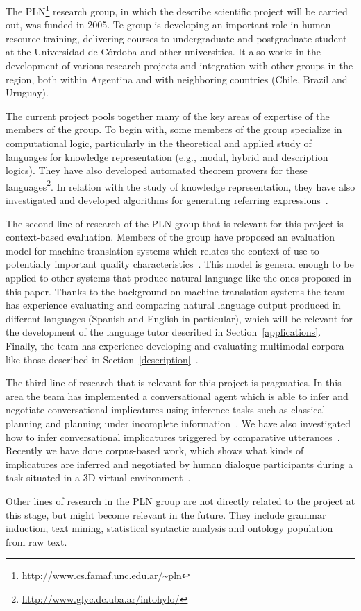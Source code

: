 
The PLN\footnote{\url{http://www.cs.famaf.unc.edu.ar/~pln}} research group, 
in which the describe scientific project will be carried out, was funded in 2005.
Te group is developing an important role in human resource training,
delivering courses to undergraduate and postgraduate student at the Universidad
de C\'ordoba and
other universities. It also works in the development of various research
projects and integration with other groups in the region, both within Argentina and
with neighboring countries (Chile, Brazil and Uruguay). 

The current project pools together many of the key areas of expertise of the members
of the group. To begin with, some members of the group specialize in computational
logic, particularly in the theoretical and applied study of languages for
knowledge representation (e.g., modal, hybrid and description logics). They
have also developed  automated theorem provers for these
languages\footnote{\url{http://www.glyc.dc.uba.ar/intohylo/}}. In relation with 
the study of knowledge representation, they have also investigated and developed
algorithms for generating referring expressions~\cite{AKS08}.

The second line of research of the PLN group that is relevant for this project
is context-based evaluation. Members of the group have proposed an evaluation model
for machine translation systems which relates the context of use  to potentially important quality
characteristics~\cite{estr:impr08,estr:femt09}. This model is general enough to
be applied to other systems that produce natural language like the ones
proposed in this paper. 
Thanks to the background on machine translation systems the team has experience evaluating and
comparing natural language output produced in different languages (Spanish and
English in particular), which will be relevant for the development of the
language tutor described in Section~\ref{applications}. 
Finally, the team has experience developing and evaluating   
 multimodal corpora like those described in Section~\ref{description}~\cite{multieval}.

The third line of research that is relevant for this project is pragmatics. In
this area the team has implemented a conversational agent which is able to infer and
negotiate conversational implicatures using inference tasks such as
classical planning and planning under incomplete information~\cite{benotti09b}.
We have also investigated  how to infer conversational implicatures triggered
by comparative utterances~\cite{benotti09a}. Recently we have done corpus-based
work, which shows what kinds of implicatures are inferred and negotiated by
human dialogue participants during a task situated in a 3D
virtual environment~\cite{benotti09c}. 

Other lines of research in the PLN group are not directly related
to the project at this stage, but might become relevant in the
future. They include grammar induction, text mining, statistical syntactic analysis
and ontology population from raw text. 





